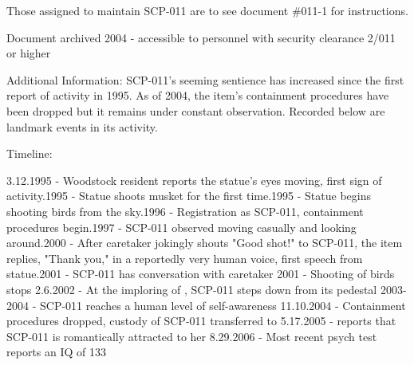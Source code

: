  Those assigned to maintain SCP-011 are to see document \#011-1 for instructions.

\begin{boxedminipage}{\textwidth}

\lb Document archived 2004 - accessible to personnel with security clearance 2/011 or higher\rb

Additional Information: SCP-011's seeming sentience has increased since the first report of activity in 1995. As of 2004, the item's containment procedures have been dropped but it remains under constant observation. Recorded below are landmark events in its activity.

Timeline:
\begin{flushleft}
3.12.1995 - Woodstock resident reports the statue's eyes moving, first sign of activity.1995 - Statue shoots musket for the first time.1995 - Statue begins shooting birds from the sky.1996 - Registration as SCP-011, containment procedures begin.1997 - SCP-011 observed moving casually and looking around.2000 - After caretaker   jokingly shouts "Good shot!" to SCP-011, the item replies, "Thank you," in a reportedly very human voice, first speech from statue.2001 - SCP-011 has conversation with caretaker  
2001 - Shooting of birds stops
2.6.2002 - At the imploring of  , SCP-011 steps down from its pedestal
2003-2004 - SCP-011 reaches a human level of self-awareness
11.10.2004 - Containment procedures dropped, custody of SCP-011 transferred to  
5.17.2005 -   reports that SCP-011 is romantically attracted to her
8.29.2006 - Most recent psych test reports an IQ of 133
\end{flushleft}
\end{boxedminipage}